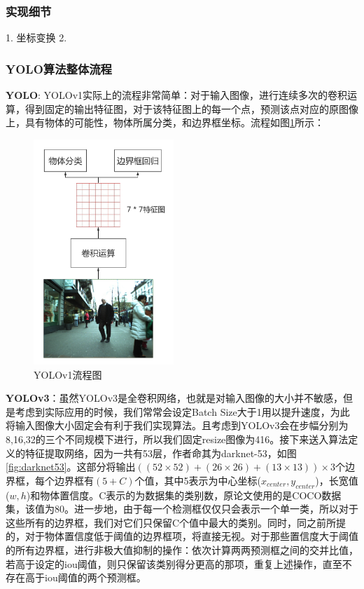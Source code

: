\documentclass[12pt,a4paper,titlepage]{article}
\begin{document}
\subsubsection{实现细节}
1. 坐标变换
2. 

\subsubsection{YOLO算法整体流程}
\textbf{YOLO}:  YOLOv1实际上的流程非常简单：对于输入图像，进行连续多次的卷积运算，得到固定的输出特征图，对于该特征图上的每一个点，预测该点对应的原图像上，具有物体的可能性，物体所属分类，和边界框坐标。流程如图\ref{fig:yolov1Process}所示：
\begin{figure}[h]
\centering
\includegraphics[height=8.5cm]{img/yolov1.png}
\caption{YOLOv1流程图}
\label{fig:yolov1Process}
\end{figure}

\textbf{YOLOv3}：虽然YOLOv3是全卷积网络，也就是对输入图像的大小并不敏感，但是考虑到实际应用的时候，我们常常会设定Batch Size大于1用以提升速度，为此将输入图像大小固定会有利于我们实现算法。且考虑到YOLOv3会在步幅分别为8,16,32的三个不同规模下进行，所以我们固定resize图像为416。接下来送入算法定义的特征提取网络，因为一共有53层，作者命其为darknet-53，如图\ref{fig:darknet53}。这部分将输出$((52\times 52)+(26\times 26)+(13\times 13))\times 3$个边界框，每个边界框有$(5+C)$个值，其中5表示为中心坐标($x_{center}, y_{center}$)，长宽值($w, h$)和物体置信度。C表示的为数据集的类别数，原论文使用的是COCO数据集，该值为80。进一步地，由于每一个检测框仅仅只会表示一个单一类，所以对于这些所有的边界框，我们对它们只保留C个值中最大的类别。同时，同之前所提的，对于物体置信度低于阈值的边界框项，将直接无视。对于那些置信度大于阈值的所有边界框，进行非极大值抑制的操作：依次计算两两预测框之间的交并比值，若高于设定的iou阈值，则只保留该类别得分更高的那项，重复上述操作，直至不存在高于iou阈值的两个预测框。
\end{document}
